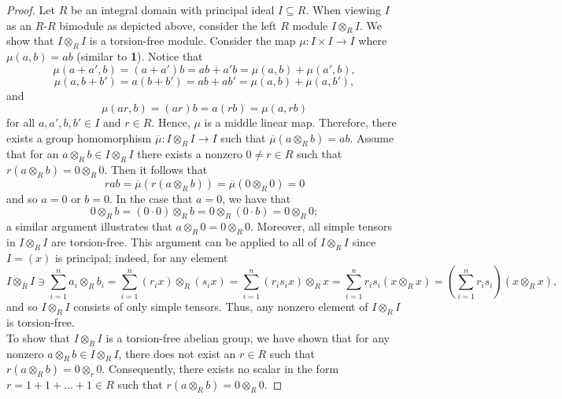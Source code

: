 \documentclass[ 12pt ]{article}
\begin{document}
\begin{enumerate}
		\begin{proof}
			Let $R$ be an integral domain with principal ideal $I \subseteq R$. When viewing $I$ as an $R$-$R$ bimodule as depicted above, consider the left $R$ module $I \otimes_R I$. We show that $I \otimes_R I$ is a torsion-free module. Consider the map $\mu : I \times I \to I$ where $\mu(a, b) = ab$ (similar to \textbf{1}). Notice that $$\mu(a + a', b) = (a + a') b = ab + a'b = \mu(a, b) + \mu(a', b),$$ $$\mu(a, b + b') = a(b + b') = ab + ab' = \mu(a, b) + \mu(a, b'),$$ and $$\mu(ar, b) = (ar)b = a(rb) = \mu(a, rb)$$ for all $a, a', b, b' \in I$ and $r \in R$. Hence, $\mu$ is a middle linear map. Therefore, there exists a group homomorphism $\overline{\mu} : I \otimes_R I \to I$ such that $\overline{\mu}(a \otimes_R b) = ab$. Assume that for an $a \otimes_R b \in I \otimes_R I$ there exists a nonzero $0 \neq r \in R$ such that $r(a \otimes_R b) = 0 \otimes_R 0$. Then it follows that $$rab = \overline{\mu}(r(a \otimes_R b)) = \overline{\mu}(0 \otimes_R 0) = 0$$ and so $a = 0$ or $b = 0$. In the case that $a = 0$, we have that $$0 \otimes_R b = (0 
		\cdot 0) \otimes_R b = 0 \otimes_R (0 \cdot b) = 0 \otimes_R 0;$$ a similar argument illustrates that $a \otimes_R 0 = 0 \otimes_R 0$. Moreover, all simple tensors in $I \otimes_R I$ are torsion-free. This argument can be applied to all of $I \otimes_R I$ since $I = (x)$ is principal; indeed, for any element $$I \otimes_R I \ni \sum_{i=1}^n a_i \otimes_R b_i = \sum_{i=1}^n (r_i x) \otimes_R (s_i x) = \sum_{i=1}^n (r_i s_i x) \otimes_R x = \sum_{i=1}^n r_i s_i (x \otimes_R x) = \left ( \sum_{i=1}^n r_i s_i \right )(x \otimes_R x),$$ and so $I \otimes_R I$ consists of only simple tensors. Thus, any nonzero element of $I \otimes_R I$ is torsion-free. \\

		To show that $I \otimes_R I$ is a torsion-free abelian group, we have shown that for any nonzero $a \otimes_R b \in I \otimes_R I$, there does not exist an $r \in R$ such that $r(a \otimes_R b) = 0 \otimes_r 0$. Consequently, there exists no scalar in the form $r = 1 + 1 + \hdots + 1 \in R$ such that $r(a \otimes_R b) = 0 \otimes_R 0$.
		\end{proof}



\end{enumerate}
\end{document}
